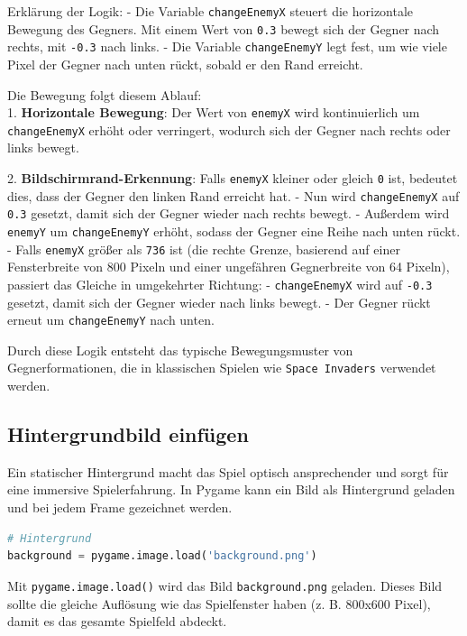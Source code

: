 \documentclass{article}
\begin{document}
Erklärung der Logik:
- Die Variable \texttt{changeEnemyX} steuert die horizontale Bewegung des Gegners. Mit einem Wert von \texttt{0.3} bewegt sich der Gegner nach rechts, mit \texttt{-0.3} nach links.
- Die Variable \texttt{changeEnemyY} legt fest, um wie viele Pixel der Gegner nach unten rückt, sobald er den Rand erreicht.

Die Bewegung folgt diesem Ablauf:\\
1. \textbf{Horizontale Bewegung}:  
   Der Wert von \texttt{enemyX} wird kontinuierlich um \texttt{changeEnemyX} erhöht oder verringert, wodurch sich der Gegner nach rechts oder links bewegt.
   
2. \textbf{Bildschirmrand-Erkennung}: 
   Falls \texttt{enemyX} kleiner oder gleich \texttt{0} ist, bedeutet dies, dass der Gegner den linken Rand erreicht hat.  
     - Nun wird \texttt{changeEnemyX} auf \texttt{0.3} gesetzt, damit sich der Gegner wieder nach rechts bewegt.  
     - Außerdem wird \texttt{enemyY} um \texttt{changeEnemyY} erhöht, sodass der Gegner eine Reihe nach unten rückt.
   - Falls \texttt{enemyX} größer als \texttt{736} ist (die rechte Grenze, basierend auf einer Fensterbreite von 800 Pixeln und einer ungefähren Gegnerbreite von 64 Pixeln), passiert das Gleiche in umgekehrter Richtung:  
     - \texttt{changeEnemyX} wird auf \texttt{-0.3} gesetzt, damit sich der Gegner wieder nach links bewegt.  
     - Der Gegner rückt erneut um \texttt{changeEnemyY} nach unten.

Durch diese Logik entsteht das typische Bewegungsmuster von Gegnerformationen, die in klassischen Spielen wie \texttt{Space Invaders} verwendet werden.

\subsection{Hintergrundbild einfügen}
Ein statischer Hintergrund macht das Spiel optisch ansprechender und sorgt für eine immersive Spielerfahrung. In Pygame kann ein Bild als Hintergrund geladen und bei jedem Frame gezeichnet werden.

\begin{lstlisting}[style=pythonstyle, language=Python]
# Hintergrund
background = pygame.image.load('background.png')
\end{lstlisting}

Mit \texttt{pygame.image.load()} wird das Bild \texttt{background.png} geladen. Dieses Bild sollte die gleiche Auflösung wie das Spielfenster haben (z. B. 800x600 Pixel), damit es das gesamte Spielfeld abdeckt.
\end{document}
